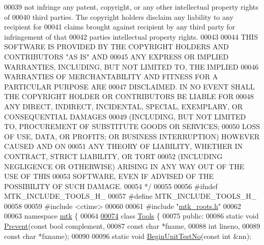 \begin{DoxyCode}
00039 \textcolor{comment}{not infringe any patent, copyright, or any other intellectual property rights of}
00040 \textcolor{comment}{third parties. The copyright holders disclaim any liability to any recipient for}
00041 \textcolor{comment}{claims brought against recipient by any third party for infringement of that}
00042 \textcolor{comment}{parties intellectual property rights.}
00043 \textcolor{comment}{}
00044 \textcolor{comment}{THIS SOFTWARE IS PROVIDED BY THE COPYRIGHT HOLDERS AND CONTRIBUTORS "AS IS" AND}
00045 \textcolor{comment}{ANY EXPRESS OR IMPLIED WARRANTIES, INCLUDING, BUT NOT LIMITED TO, THE IMPLIED}
00046 \textcolor{comment}{WARRANTIES OF MERCHANTABILITY AND FITNESS FOR A PARTICULAR PURPOSE ARE}
00047 \textcolor{comment}{DISCLAIMED. IN NO EVENT SHALL THE COPYRIGHT HOLDER OR CONTRIBUTORS BE LIABLE FOR}
00048 \textcolor{comment}{ANY DIRECT, INDIRECT, INCIDENTAL, SPECIAL, EXEMPLARY, OR CONSEQUENTIAL DAMAGES}
00049 \textcolor{comment}{(INCLUDING, BUT NOT LIMITED TO, PROCUREMENT OF SUBSTITUTE GOODS OR SERVICES;}
00050 \textcolor{comment}{LOSS OF USE, DATA, OR PROFITS; OR BUSINESS INTERRUPTION) HOWEVER CAUSED AND ON}
00051 \textcolor{comment}{ANY THEORY OF LIABILITY, WHETHER IN CONTRACT, STRICT LIABILITY, OR TORT}
00052 \textcolor{comment}{(INCLUDING NEGLIGENCE OR OTHERWISE) ARISING IN ANY WAY OUT OF THE USE OF THIS}
00053 \textcolor{comment}{SOFTWARE, EVEN IF ADVISED OF THE POSSIBILITY OF SUCH DAMAGE.}
00054 \textcolor{comment}{*/}
00055 
00056 \textcolor{preprocessor}{#ifndef MTK\_INCLUDE\_TOOLS\_H\_}
00057 \textcolor{preprocessor}{#define MTK\_INCLUDE\_TOOLS\_H\_}
00058 
00059 \textcolor{preprocessor}{#include <ctime>}
00060 
00061 \textcolor{preprocessor}{#include "\hyperlink{mtk__roots_8h}{mtk\_roots.h}"}
00062 
00063 \textcolor{keyword}{namespace }\hyperlink{namespacemtk}{mtk} \{
00064 
\hypertarget{mtk__tools_8h_source_l00074}{}\hyperlink{classmtk_1_1Tools}{00074} \textcolor{keyword}{class }\hyperlink{classmtk_1_1Tools}{Tools} \{
00075  \textcolor{keyword}{public}:
00086   \textcolor{keyword}{static} \textcolor{keywordtype}{void} \hyperlink{classmtk_1_1Tools_afe5bb096309258e2e72503fd7b41c7e0}{Prevent}(\textcolor{keyword}{const} \textcolor{keywordtype}{bool} complement,
00087                       \textcolor{keyword}{const} \textcolor{keywordtype}{char} *fname,
00088                       \textcolor{keywordtype}{int} lineno,
00089                       \textcolor{keyword}{const} \textcolor{keywordtype}{char} *fxname);
00090 
00096   \textcolor{keyword}{static} \textcolor{keywordtype}{void} \hyperlink{classmtk_1_1Tools_a26ee906d28523378522a75e25c3a4e19}{BeginUnitTestNo}(\textcolor{keyword}{const} \textcolor{keywordtype}{int} &nn);

\end{DoxyCode}
